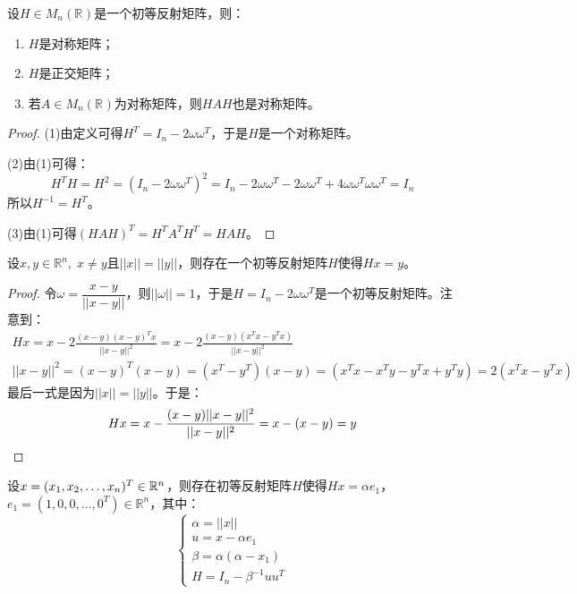 \begin{property}\label{prop:Householder}
	设$H\in M_{n}(\mathbb{R}^{})$是一个初等反射矩阵，则：
	\begin{enumerate}
		\item $H$是对称矩阵；
		\item $H$是正交矩阵；
		\item 若$A\in M_{n}(\mathbb{R}^{})$为对称矩阵，则$HAH$也是对称矩阵。
	\end{enumerate}
\end{property}
\begin{proof}
	(1)由定义可得$H^T=I_n-2\omega\omega^T$，于是$H$是一个对称矩阵。\par
	(2)由(1)可得：
	\begin{equation*}
		H^TH=H^2=(I_n-2\omega\omega^T)^2=I_n-2\omega\omega^T-2\omega\omega^T+4\omega\omega^T\omega\omega^T=I_n
	\end{equation*}
	所以$H^{-1}=H^T$。\par
	(3)由(1)可得$(HAH)^T=H^TA^TH^T=HAH$。
\end{proof}
\begin{theorem}\label{theo:HouseholderExistence}
	设$x,y\in\mathbb{R}^{n},\;x\ne y$且$||x||=||y||$，则存在一个初等反射矩阵$H$使得$Hx=y$。
\end{theorem}
\begin{proof}
	令$\omega=\dfrac{x-y}{||x-y||}$，则$||\omega||=1$，于是$H=I_n-2\omega\omega^T$是一个初等反射矩阵。注意到：
	\begin{gather*}
		Hx=x-2\frac{(x-y)(x-y)^Tx}{||x-y||^2}=x-2\frac{(x-y)(x^Tx-y^Tx)}{||x-y||^2} \\
		||x-y||^2=(x-y)^T(x-y)=(x^T-y^T)(x-y)=(x^Tx-x^Ty-y^Tx+y^Ty)=2(x^Tx-y^Tx)
	\end{gather*}
	最后一式是因为$||x||=||y||$。于是：
	\begin{equation*}
		Hx=x-\frac{(x-y)||x-y||^2}{||x-y||^2}=x-(x-y)=y\qedhere
	\end{equation*}
\end{proof}
\begin{theorem}[$H$约化定理]\label{theo:Householder}
	设$x=(x_1, x_2, \dots, x_{n})^T\in\mathbb{R}^{n}$，则存在初等反射矩阵$H$使得$Hx=\alpha e_1$，$e_1=(1,0,0,\dots,0^T)\in\mathbb{R}^{n}$，其中：
	\begin{equation*}
		\begin{cases}
			\alpha=||x|| \\
			u=x-\alpha e_1 \\
			\beta=\alpha(\alpha-x_1) \\
			H=I_n-\beta^{-1}uu^T
		\end{cases}
	\end{equation*}
\end{theorem}
